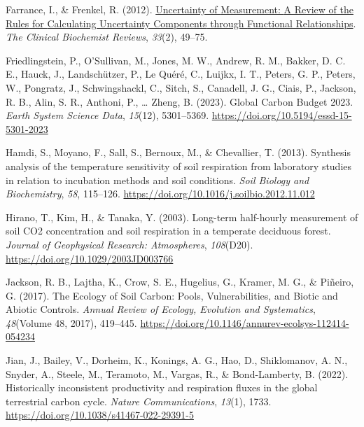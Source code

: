 \documentclass[
  letterpaper,
  DIV=11,
  numbers=noendperiod]{scrartcl}
\newlength{\cslhangindent}
\newenvironment{CSLReferences}[2] %
 {\begin{list}{}{%
  \setlength{\itemindent}{0pt}
  \setlength{\leftmargin}{0pt}
  \setlength{\parsep}{0pt}
  \ifodd #1
   \setlength{\leftmargin}{\cslhangindent}
   \setlength{\itemindent}{-1\cslhangindent}
  \fi
  \setlength{\itemsep}{#2\baselineskip}}}
 {\end{list}}
\begin{document}
\begin{CSLReferences}{1}{0}
Farrance, I., \& Frenkel, R. (2012).
\href{https://www.ncbi.nlm.nih.gov/pmc/articles/PMC3387884}{Uncertainty
of {Measurement}: {A Review} of the {Rules} for {Calculating Uncertainty
Components} through {Functional Relationships}}. \emph{The Clinical
Biochemist Reviews}, \emph{33}(2), 49--75.

Friedlingstein, P., O'Sullivan, M., Jones, M. W., Andrew, R. M., Bakker,
D. C. E., Hauck, J., Landschützer, P., Le Quéré, C., Luijkx, I. T.,
Peters, G. P., Peters, W., Pongratz, J., Schwingshackl, C., Sitch, S.,
Canadell, J. G., Ciais, P., Jackson, R. B., Alin, S. R., Anthoni, P.,
\ldots{} Zheng, B. (2023). Global {Carbon Budget} 2023. \emph{Earth
System Science Data}, \emph{15}(12), 5301--5369.
\url{https://doi.org/10.5194/essd-15-5301-2023}

Hamdi, S., Moyano, F., Sall, S., Bernoux, M., \& Chevallier, T. (2013).
Synthesis analysis of the temperature sensitivity of soil respiration
from laboratory studies in relation to incubation methods and soil
conditions. \emph{Soil Biology and Biochemistry}, \emph{58}, 115--126.
\url{https://doi.org/10.1016/j.soilbio.2012.11.012}

Hirano, T., Kim, H., \& Tanaka, Y. (2003). Long-term half-hourly
measurement of soil {CO2} concentration and soil respiration in a
temperate deciduous forest. \emph{Journal of Geophysical Research:
Atmospheres}, \emph{108}(D20).
\url{https://doi.org/10.1029/2003JD003766}

Jackson, R. B., Lajtha, K., Crow, S. E., Hugelius, G., Kramer, M. G., \&
Piñeiro, G. (2017). The {Ecology} of {Soil Carbon}: {Pools},
{Vulnerabilities}, and {Biotic} and {Abiotic Controls}. \emph{Annual
Review of Ecology, Evolution and Systematics}, \emph{48}(Volume 48,
2017), 419--445.
\url{https://doi.org/10.1146/annurev-ecolsys-112414-054234}

Jian, J., Bailey, V., Dorheim, K., Konings, A. G., Hao, D., Shiklomanov,
A. N., Snyder, A., Steele, M., Teramoto, M., Vargas, R., \&
Bond-Lamberty, B. (2022). Historically inconsistent productivity and
respiration fluxes in the global terrestrial carbon cycle. \emph{Nature
Communications}, \emph{13}(1), 1733.
\url{https://doi.org/10.1038/s41467-022-29391-5}


\end{CSLReferences}
\end{document}
